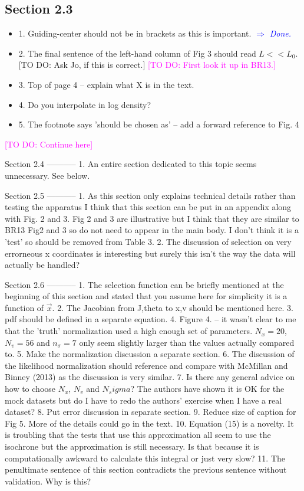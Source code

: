 \documentclass[10pt,a4paper]{article}
\newcommand{\Wilma}[1]{\textcolor{Magenta}{#1}}
\newcommand{\Comment}[1]{\textsl{\textcolor{Blue}{$\Longrightarrow$ {#1}}}}
\newcommand{\Jo}[1]{\textcolor{YellowOrange}{#1}}
\begin{document}
\subsection{Section 2.3}
\begin{itemize}
\item 1. Guiding-center should not be in brackets as this is important. \Comment{Done.}
\item 2. The final sentence of the left-hand column of Fig 3 should read $L<<L_0$. \Jo{[TO DO: Ask Jo, if this is correct.]} \Wilma{[TO DO: First look it up in BR13.]}
\item 3. Top of page 4 -- explain what X is in the text.
\item 4. Do you interpolate in log density?
\item 5. The footnote says 'should be chosen as' -- add a forward reference to Fig. 4
\end{itemize}

\Wilma{[TO DO: Continue here]}

Section 2.4
-----------
1. An entire section dedicated to this topic seems unnecessary. See below.

Section 2.5
-----------
1. As this section only explains technical details rather than testing the apparatus
I think that this section can be put in an appendix along with Fig. 2 and 3. Fig 2
and 3 are illustrative but I think that they are similar to BR13 Fig2 and 3 so do
not need to appear in the main body. I don't think it is a 'test' so should be
removed from Table 3.
2. The discussion of selection on very errorneous x coordinates is interesting but
surely this isn't the way the data will actually be handled?

Section 2.6
-----------
1. The selection function can be briefly mentioned at the beginning of this section
and stated that you assume here for simplicity it is a function of $\vec{x}$.
2. The Jacobian from J,theta to x,v should be mentioned here.
3. pdf should be defined in a separate equation.
4. Figure 4. -- it wasn't clear to me that the 'truth' normalization used a high
enough set of parameters. $N_x=20$, $N_v=56$ and $n_\sigma=7$ only seem slightly larger than
the values actually compared to.
5. Make the normalization discussion a separate section.
6. The discussion of the likelihood normalization should reference and compare with
McMillan and Binney (2013) as the discussion is very similar.
7. Is there any general advice on how to choose $N_x$, $N_v$ and $N_sigma$? The authors
have shown it is OK for the mock datasets but do I have to redo the authors'
exercise when I have a real dataset?
8. Put error discussion in separate section.
9. Reduce size of caption for Fig 5. More of the details could go in the text.
10. Equation (15) is a novelty. It is troubling that the tests that use this
approximation all seem to use the isochrone but the approximation is still
necessary. Is that because it is computationally awkward to calculate this integral
or just very slow?
11. The penultimate sentence of this section contradicts the previous sentence
without validation. Why is this?
\end{document}
